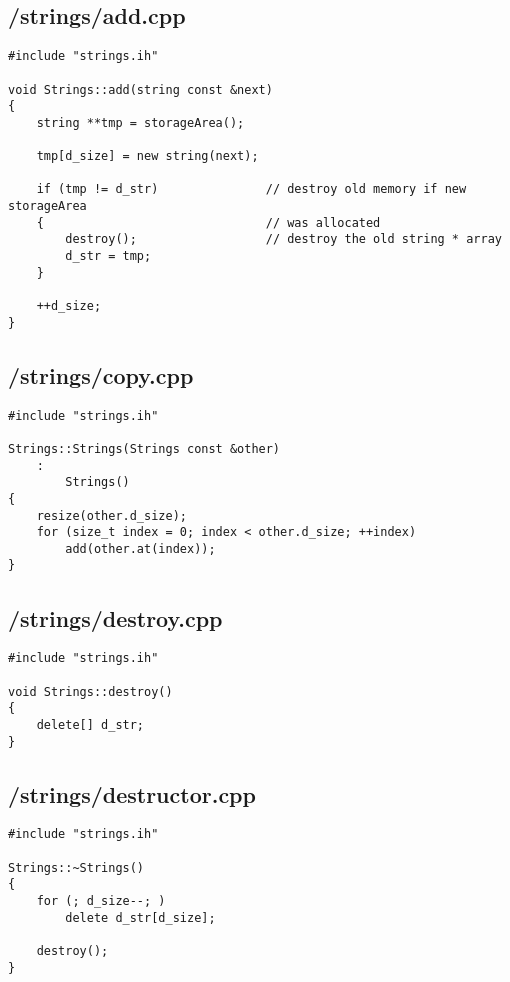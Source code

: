 \documentclass{article}
\begin{document}
\subsection*{/strings/add.cpp}
\begin{verbatim}
#include "strings.ih"

void Strings::add(string const &next)
{
    string **tmp = storageArea();

    tmp[d_size] = new string(next);

    if (tmp != d_str)               // destroy old memory if new storageArea 
    {                               // was allocated
        destroy();                  // destroy the old string * array
        d_str = tmp;
    }

    ++d_size;
}

\end{verbatim}
\subsection*{/strings/copy.cpp}
\begin{verbatim}
#include "strings.ih"

Strings::Strings(Strings const &other)
	:
        Strings()
{
    resize(other.d_size);
    for (size_t index = 0; index < other.d_size; ++index)
        add(other.at(index));
}
\end{verbatim}
\subsection*{/strings/destroy.cpp}
\begin{verbatim}
#include "strings.ih"

void Strings::destroy()
{
    delete[] d_str;
}

\end{verbatim}
\subsection*{/strings/destructor.cpp}
\begin{verbatim}
#include "strings.ih"

Strings::~Strings()
{
    for (; d_size--; )
        delete d_str[d_size];

    destroy();
}

\end{verbatim}
\end{document}
